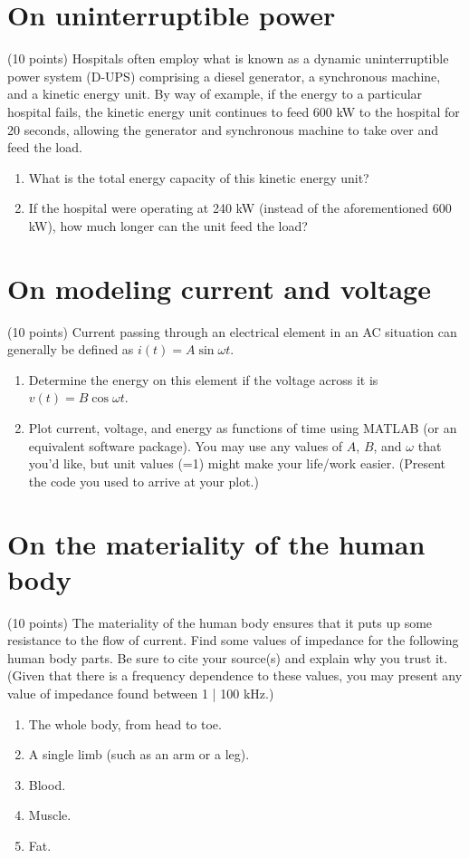 \documentclass[11pt]{book}
\begin{document}
\section{On uninterruptible power}
(10 points) Hospitals often employ what is known as a dynamic uninterruptible power system (D-UPS) comprising a diesel generator, a synchronous machine, and a kinetic energy unit. By way of example, if the energy to a particular hospital fails, the kinetic energy unit continues to feed 600 kW to the hospital for 20 seconds, allowing the generator and synchronous machine to take over and feed the load.
\begin{enumerate}
	\item What is the total energy capacity of this kinetic energy unit?
	\item If the hospital were operating at 240 kW (instead of the aforementioned 600 kW), how much longer can the unit feed the load?
\end{enumerate}


\section{On modeling current and voltage}
(10 points) Current passing through an electrical element in an AC situation can generally be defined as $i(t) = A \sin \omega t$. 
\begin{enumerate}
	\item Determine the energy on this element if the voltage across it is 
\\
$v(t) = B \cos \omega t$.
	\item Plot current, voltage, and energy as functions of time using MATLAB (or an equivalent software package). You may use any values of $A$, $B$, and $\omega$ that you’d like, but unit values (=1) might make your life/work easier. (Present the code you used to arrive at your plot.)
\end{enumerate}


\section{On the materiality of the human body}
(10 points) The materiality of the human body ensures that it puts up some resistance to the flow of current. Find some values of impedance for the following human body parts. Be sure to cite your source(s) and explain why you trust it. (Given that there is a frequency dependence to these values, you may present any value of impedance found between 1 | 100 kHz.)
\begin{enumerate}
	\item The whole body, from head to toe.
	\item A single limb (such as an arm or a leg).
	\item Blood.
	\item Muscle.
	\item Fat.
\end{enumerate}
\end{document}
